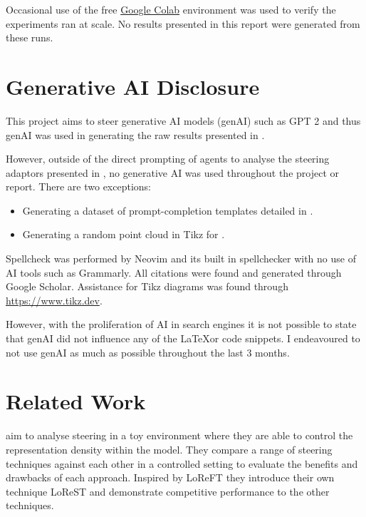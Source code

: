 Occasional use of the free \href{https://colab.research.google.com/}{Google Colab} environment was used to verify the experiments ran at scale.
No results presented in this report were generated from these runs.

\section{Generative AI Disclosure}

This project aims to steer generative AI models (genAI) such as GPT 2 \citep{gpt-2} and thus genAI was used in generating the raw results presented in .

However, outside of the direct prompting of agents to analyse the steering adaptors presented in , no generative AI was used throughout the project or report.
There are two exceptions:
\begin{itemize}[nolistsep]
    \item Generating a dataset of prompt-completion templates detailed in .
    \item Generating a random point cloud in Tikz for .
\end{itemize}

Spellcheck was performed by Neovim and its built in spellchecker with no use of AI tools such as Grammarly.
All citations were found and generated through Google Scholar.
Assistance for Tikz diagrams was found through \href{https://www.tikz.dev}{https://www.tikz.dev}.

However, with the proliferation of AI in search engines it is not possible to state that genAI did not influence any of the \LaTeX or code snippets.
I endeavoured to not use genAI as much as possible throughout the last 3 months.

\section{Related Work}

aim to analyse steering in a toy environment where they are able to control the representation density within the model.
They compare a range of steering techniques \citep{caa, reft, mimic} against each other in a controlled setting to evaluate the benefits and drawbacks of each approach.
Inspired by LoReFT \citep{reft} they introduce their own technique LoReST and demonstrate competitive performance to the other techniques.

